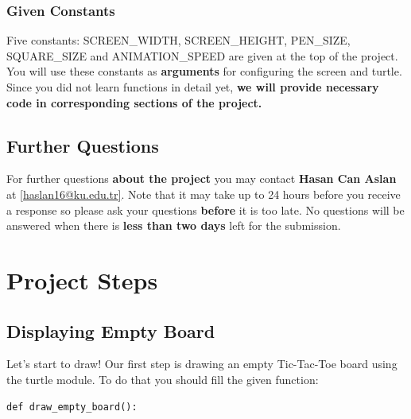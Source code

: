 \documentclass[a4paper]{article}
\makeatletter
\newcommand{\contactName}{Hasan Can Aslan}
\newcommand{\contactMail}{haslan16@ku.edu.tr}
\makeatother
\begin{document}
\subsubsection{Given Constants}
Five constants: SCREEN\_WIDTH, SCREEN\_HEIGHT, PEN\_SIZE, SQUARE\_SIZE and ANIMATION\_SPEED are given at the top of the project. You will use these constants as \textbf{arguments} for configuring the screen and turtle. Since you did not learn functions in detail yet, \textbf{we will provide necessary code in corresponding sections of the project.}

\subsection{Further Questions}
For further questions \textbf{about the project} you may contact \textbf{\contactName} at \href{mailto:\contactMail}{\mbox{[\contactMail]}}. Note that it may take up to 24 hours before you receive a response so please ask your questions \textbf{before} it is too late. No questions will be answered when there is \textbf{less than two days} left for the submission.

\newpage

\section{Project Steps}
\label{worlds}


\subsection{Displaying Empty Board}
Let's start to draw! Our first step is drawing an empty Tic-Tac-Toe board using the turtle module. To do that you should fill the given function:
\begin{lstlisting} 
def draw_empty_board():
\end{lstlisting}
\end{document}

